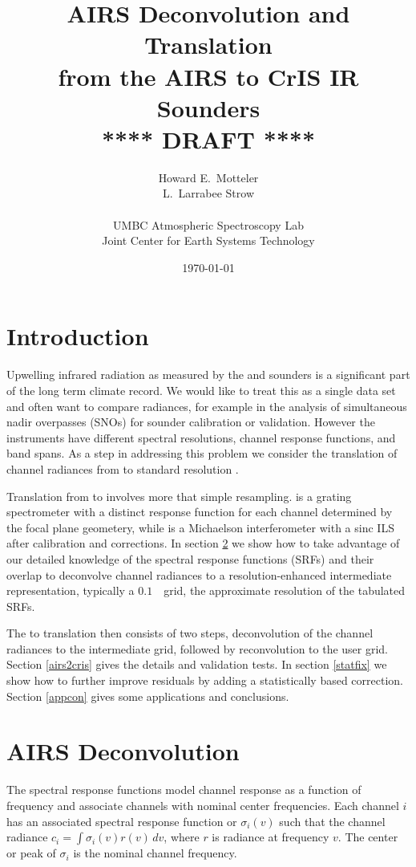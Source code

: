 \documentclass[11pt]{article}
\title{AIRS Deconvolution and Translation \\
  from the AIRS to CrIS IR Sounders \\
  \vspace{3mm}
  {****} DRAFT {****}\\
}
\author{Howard E.~Motteler \\
  L.~Larrabee Strow \\
  \\
  UMBC Atmospheric Spectroscopy Lab \\
  Joint Center for Earth Systems Technology \\
}
\date{\today}
\begin{document}
\maketitle

\section{Introduction}

Upwelling infrared radiation as measured by the {\airs} \cite{airs1}
and {\cris} \cite{cris1,cris2} sounders is a significant part of the
long term climate record.  We would like to treat this as a single
data set and often want to compare radiances, for example in the
analysis of simultaneous nadir overpasses (SNOs) for sounder
calibration or validation.  However the instruments have different
spectral resolutions, channel response functions, and band spans.
As a step in addressing this problem we consider the translation of
channel radiances from {\airs} to standard resolution {\cris}.

Translation from {\airs} to {\cris} involves more that simple
resampling.  {\airs} is a grating spectrometer with a distinct
response function for each channel determined by the focal plane
geometery, while {\cris} is a Michaelson interferometer with a sinc
ILS after calibration and corrections.  In section \ref{decon} we
show how to take advantage of our detailed knowledge of the {\airs}
spectral response functions (SRFs) and their overlap to deconvolve
channel radiances to a resolution-enhanced intermediate
representation, typically a $0.1$~\wn\ grid, the approximate
resolution of the tabulated {\airs} SRFs.

The {\airs} to {\cris} translation then consists of two steps,
deconvolution of the {\airs} channel radiances to the intermediate
grid, followed by reconvolution to the {\cris} user grid.  Section
\ref{airs2cris} gives the details and validation tests.  In section
\ref{statfix} we show how to further improve residuals by adding a
statistically based correction.  Section \ref{appcon} gives some
applications and conclusions.

\FloatBarrier
\section{AIRS Deconvolution}
\label{decon}

The {\airs} spectral response functions model channel response as a
function of frequency and associate channels with nominal center
frequencies.  Each {\airs} channel $i$ has an associated spectral
response function or {\srf} $\sigma_i(v)$ such that the channel
radiance $c_i = \int \sigma_i(v)r(v)\,dv$, where $r$ is radiance at
frequency $v$.  The center or peak of $\sigma_i$ is the nominal
channel frequency.
\end{document}
